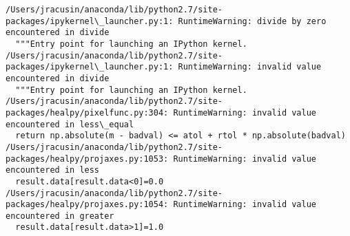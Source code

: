 \documentclass[11pt]{article}
\begin{document}
    \begin{Verbatim}[commandchars=\\\{\}]
/Users/jracusin/anaconda/lib/python2.7/site-packages/ipykernel\_launcher.py:1: RuntimeWarning: divide by zero encountered in divide
  """Entry point for launching an IPython kernel.
/Users/jracusin/anaconda/lib/python2.7/site-packages/ipykernel\_launcher.py:1: RuntimeWarning: invalid value encountered in divide
  """Entry point for launching an IPython kernel.
/Users/jracusin/anaconda/lib/python2.7/site-packages/healpy/pixelfunc.py:304: RuntimeWarning: invalid value encountered in less\_equal
  return np.absolute(m - badval) <= atol + rtol * np.absolute(badval)
/Users/jracusin/anaconda/lib/python2.7/site-packages/healpy/projaxes.py:1053: RuntimeWarning: invalid value encountered in less
  result.data[result.data<0]=0.0
/Users/jracusin/anaconda/lib/python2.7/site-packages/healpy/projaxes.py:1054: RuntimeWarning: invalid value encountered in greater
  result.data[result.data>1]=1.0

    \end{Verbatim}

    \begin{center}
    \end{center}
    { \hspace*{\fill} \\}
    
\end{document}
